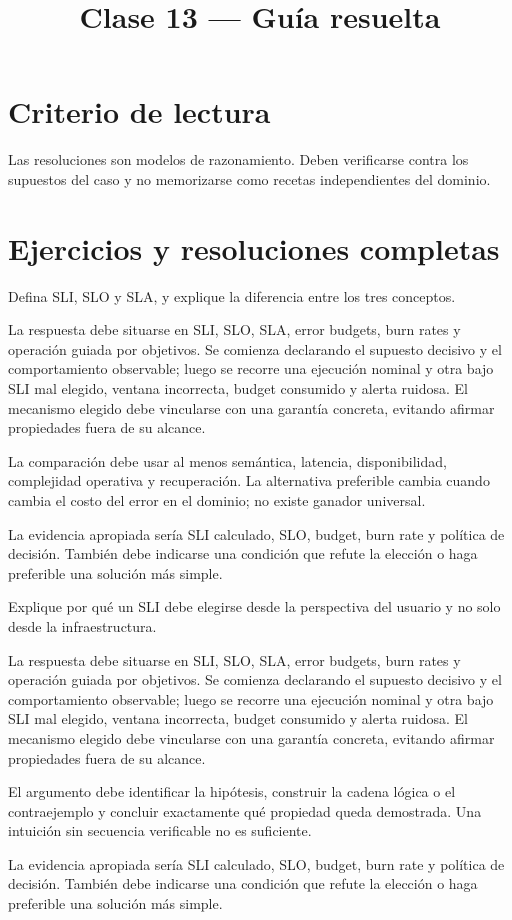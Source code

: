 \documentclass[variant=guia,cover=institutional,mode=screen]{ua-engineering-v6-article}
\title{Clase 13 --- Guía resuelta}
\author{\UAProfessor}
\date{\UADate}
\begin{document}
\section{Criterio de lectura}
Las resoluciones son modelos de razonamiento. Deben verificarse contra los supuestos del caso y no memorizarse como recetas independientes del dominio.

\section{Ejercicios y resoluciones completas}
\begin{uaexercise}
Defina SLI, SLO y SLA, y explique la diferencia entre los tres conceptos.
\end{uaexercise}
\begin{uaanswer}
La respuesta debe situarse en SLI, SLO, SLA, error budgets, burn rates y operación guiada por objetivos. Se comienza declarando el supuesto decisivo y el comportamiento observable; luego se recorre una ejecución nominal y otra bajo SLI mal elegido, ventana incorrecta, budget consumido y alerta ruidosa. El mecanismo elegido debe vincularse con una garantía concreta, evitando afirmar propiedades fuera de su alcance.

La comparación debe usar al menos semántica, latencia, disponibilidad, complejidad operativa y recuperación. La alternativa preferible cambia cuando cambia el costo del error en el dominio; no existe ganador universal.

La evidencia apropiada sería SLI calculado, SLO, budget, burn rate y política de decisión. También debe indicarse una condición que refute la elección o haga preferible una solución más simple.
\end{uaanswer}

\begin{uaexercise}
Explique por qué un SLI debe elegirse desde la perspectiva del usuario y no solo desde la infraestructura.
\end{uaexercise}
\begin{uaanswer}
La respuesta debe situarse en SLI, SLO, SLA, error budgets, burn rates y operación guiada por objetivos. Se comienza declarando el supuesto decisivo y el comportamiento observable; luego se recorre una ejecución nominal y otra bajo SLI mal elegido, ventana incorrecta, budget consumido y alerta ruidosa. El mecanismo elegido debe vincularse con una garantía concreta, evitando afirmar propiedades fuera de su alcance.

El argumento debe identificar la hipótesis, construir la cadena lógica o el contraejemplo y concluir exactamente qué propiedad queda demostrada. Una intuición sin secuencia verificable no es suficiente.

La evidencia apropiada sería SLI calculado, SLO, budget, burn rate y política de decisión. También debe indicarse una condición que refute la elección o haga preferible una solución más simple.
\end{uaanswer}
\end{document}
